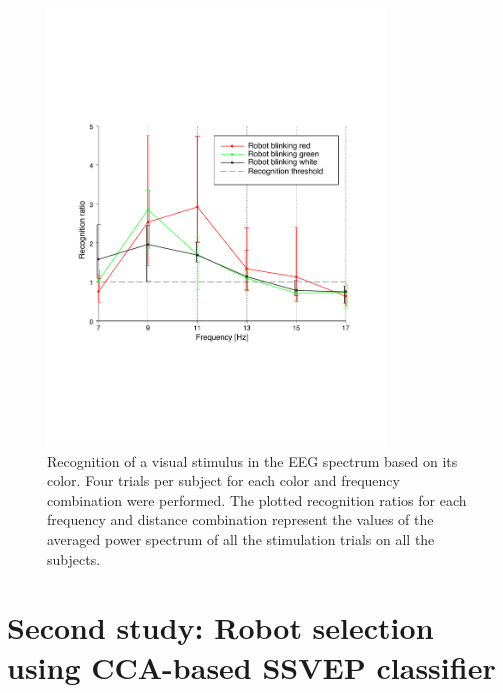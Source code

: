 \documentclass[smallextended]{svjour3}
\begin{document}
\begin{figure}
\center
\includegraphics[width=0.8\textwidth]{figures/graph-couleurs.pdf}
\caption{Recognition of a visual stimulus in the EEG spectrum based on its color. Four trials per subject for each color and frequency combination were performed. The plotted recognition ratios for each frequency and distance combination represent the values of the averaged power spectrum of all the stimulation trials on all the subjects.} \label{fig:graph-couleurs}
\end{figure}

\section{Second study: Robot selection using CCA-based SSVEP classifier}
\label{sec:CCA_approach}
\end{document}
